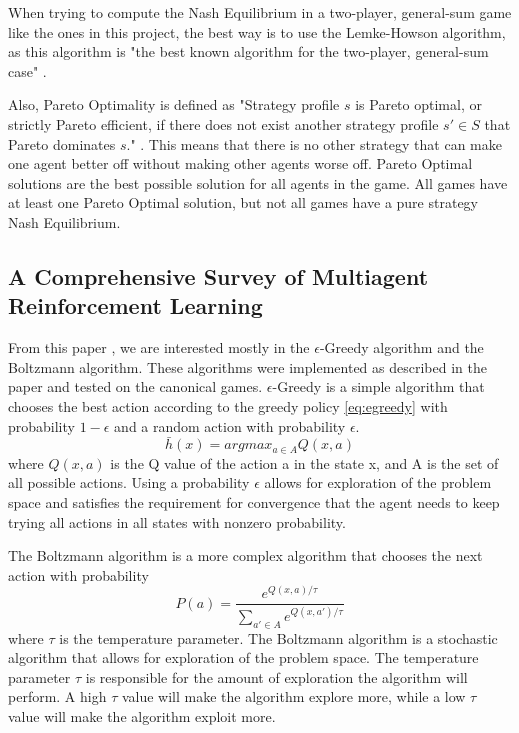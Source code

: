 \documentclass[12pt,a4paper, onecolumn]{exam}
\begin{document}
When trying to compute the Nash Equilibrium in a two-player, general-sum game like the ones in this project, the best way is to use the Lemke-Howson algorithm,
as this algorithm is "the best known algorithm for the two-player, general-sum case" \cite{shoham}.

Also, Pareto Optimality is defined as "Strategy profile $s$ is Pareto optimal, or strictly Pareto efficient, if there does not exist another strategy profile $s' \in S$ that Pareto dominates $s$." \cite{shoham}.
This means that there is no other strategy that can make one agent better off without making other agents worse off. Pareto Optimal solutions are the best possible solution for all agents in the game.
All games have at least one Pareto Optimal solution, but not all games have a pure strategy Nash Equilibrium.

\subsection{A Comprehensive Survey of Multiagent Reinforcement Learning}

From this paper \cite{busoniu}, we are interested mostly in the $\epsilon$-Greedy algorithm and the Boltzmann algorithm. These algorithms were implemented as described in the paper and tested on the canonical games.
$\epsilon$-Greedy is a simple algorithm that chooses the best action according to the greedy policy \ref{eq:egreedy} with probability $1 - \epsilon$ and a random action with probability $\epsilon$.
\begin{equation}\label{eq:egreedy}
    \bar{h}(x) = argmax_{a \in A} Q(x,a)
\end{equation}
where $Q(x,a)$ is the Q value of the action a in the state x, and A is the set of all possible actions.
Using a probability $\epsilon$ allows for exploration of the problem space and satisfies the requirement for convergence that the agent needs to keep trying all actions
in all states with nonzero probability.

The Boltzmann algorithm is a more complex algorithm that chooses the next action with probability
\begin{equation}\label{eq:boltzmann}
    P(a) = \frac{e^{Q(x,a)/\tau}}{\sum_{a' \in A} e^{Q(x,a')/\tau}}
\end{equation}
where $\tau$ is the temperature parameter. The Boltzmann algorithm is a stochastic algorithm that allows for exploration of the problem space. The temperature parameter $\tau$ is responsible
for the amount of exploration the algorithm will perform. A high $\tau$ value will make the algorithm explore more, while a low $\tau$ value will make the algorithm exploit more.
\end{document}

